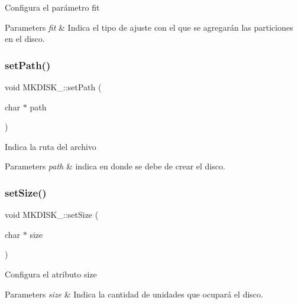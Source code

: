 Configura el parámetro fit 
\begin{DoxyParams}{Parameters}
{\em fit} & Indica el tipo de ajuste con el que se agregarán las particiones en el disco. \\
\hline
\end{DoxyParams}
\mbox{\label{classMKDISK___ab46a4029dc7384bf7687c71221139a38}} 
\subsubsection{\texorpdfstring{set\+Path()}{setPath()}}
{\footnotesize\ttfamily void M\+K\+D\+I\+S\+K\+\_\+\+::set\+Path (\begin{DoxyParamCaption}\item[{char $\ast$}]{path }\end{DoxyParamCaption})}

Indica la ruta del archivo 
\begin{DoxyParams}{Parameters}
{\em path} & indica en donde se debe de crear el disco. \\
\hline
\end{DoxyParams}
\mbox{\label{classMKDISK___a6fdf50f3e20009c7a84f3311ba1bc70c}} 
\subsubsection{\texorpdfstring{set\+Size()}{setSize()}}
{\footnotesize\ttfamily void M\+K\+D\+I\+S\+K\+\_\+\+::set\+Size (\begin{DoxyParamCaption}\item[{char $\ast$}]{size }\end{DoxyParamCaption})}

Configura el atributo size 
\begin{DoxyParams}{Parameters}
{\em size} & Indica la cantidad de unidades que ocupará el disco. \\
\hline
\end{DoxyParams}
\mbox{\label{classMKDISK___a7a7755430182c5668dbbacf102df839d}} 
